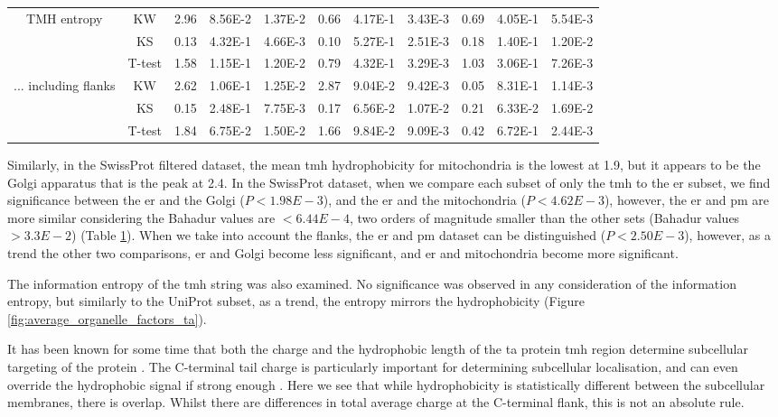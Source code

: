 \begin{table}[htbp]
\begin{tabular}{ccccccccccc}
        \multirow{3}[0]{*}{TMH entropy} &  KW & 2.96  & 8.56E-2 & 1.37E-2 & 0.66  & 4.17E-1 & 3.43E-3 & 0.69  & 4.05E-1 & 5.54E-3 \\
                                &  KS & 0.13  & 4.32E-1 & 4.66E-3 & 0.10  & 5.27E-1 & 2.51E-3 & 0.18 & 1.40E-1 & 1.20E-2 \\
                                &  T-test & 1.58  & 1.15E-1 & 1.20E-2 & 0.79  & 4.32E-1 & 3.29E-3 & 1.03 & 3.06E-1 & 7.26E-3 \\
        \midrule
        \multirow{3}[0]{*}{... including flanks} &  KW & 2.62  & 1.06E-1 & 1.25E-2 & 2.87  & 9.04E-2 & 9.42E-3 & 0.05 & 8.31E-1 & 1.14E-3 \\
                                &  KS & 0.15  & 2.48E-1 & 7.75E-3 & 0.17  & 6.56E-2 & 1.07E-2 & 0.21 & 6.33E-2 & 1.69E-2 \\
                                &  T-test & 1.84  & 6.75E-2 & 1.50E-2 & 1.66  & 9.84E-2 & 9.09E-3 & 0.42 & 6.72E-1 & 2.44E-3 \\
        \end{tabular}%
                        \label{table:organellesswissstats}
        \end{table}%

Similarly, in the SwissProt filtered dataset, the mean \gls{tmh} hydrophobicity for mitochondria is the lowest at 1.9, but it appears to be the Golgi apparatus that is the peak at 2.4.
In the SwissProt dataset, when we compare each subset of only the \gls{tmh} to the \gls{er} subset, we find significance between the \gls{er} and the Golgi ($P<1.98E-3$), and the \gls{er} and the mitochondria ($P<4.62E-3$), however, the \gls{er} and \gls{pm} are more similar considering the Bahadur values are $<6.44E-4$, two orders of magnitude smaller than the other sets (Bahadur values $>3.3E-2$) (Table \ref{table:organellesswissstats}).
When we take into account the flanks, the \gls{er} and \gls{pm} dataset can be distinguished ($P<2.50E-3$), however, as a trend the other two comparisons, \gls{er} and Golgi become less significant, and \gls{er} and mitochondria become more significant.

The information entropy of the \gls{tmh} string was also examined.
No significance was observed in any consideration of the information entropy, but similarly to the UniProt subset, as a trend, the entropy mirrors the hydrophobicity (Figure \ref{fig:average_organelle_factors_ta}).

It has been known for some time that both the charge and the hydrophobic length of the \gls{ta} protein \gls{tmh} region determine subcellular targeting of the protein \cite{Borgese2003}.
The C-terminal tail charge is particularly important for determining subcellular localisation, and can even override the hydrophobic signal if strong enough \cite{Costello2017}.
Here we see that while hydrophobicity is statistically different between the subcellular membranes, there is overlap.
Whilst there are differences in total average charge at the C-terminal flank, this is not an absolute rule.

